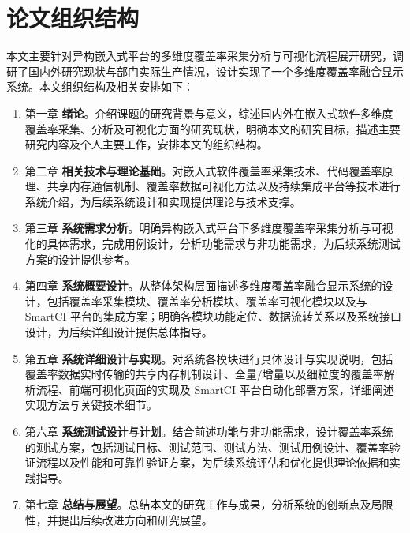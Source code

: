 \section{论文组织结构}
    本文主要针对异构嵌入式平台的多维度覆盖率采集分析与可视化流程展开研究，调研了国内外研究现状与部门实际生产情况，设计实现了一个多维度覆盖率融合显示系统。本文组织结构及相关安排如下：
    \begin{enumerate}
        \item 第一章 \textbf{绪论}。介绍课题的研究背景与意义，综述国内外在嵌入式软件多维度覆盖率采集、分析及可视化方面的研究现状，明确本文的研究目标，描述主要研究内容及个人主要工作，安排本文的组织结构。
        \item 第二章 \textbf{相关技术与理论基础}。对嵌入式软件覆盖率采集技术、代码覆盖率原理、共享内存通信机制、覆盖率数据可视化方法以及持续集成平台等技术进行系统介绍，为后续系统设计和实现提供理论与技术支撑。
        \item 第三章 \textbf{系统需求分析}。明确异构嵌入式平台下多维度覆盖率采集分析与可视化的具体需求，完成用例设计，分析功能需求与非功能需求，为后续系统测试方案的设计提供参考。
        \item 第四章 \textbf{系统概要设计}。从整体架构层面描述多维度覆盖率融合显示系统的设计，包括覆盖率采集模块、覆盖率分析模块、覆盖率可视化模块以及与 SmartCI 平台的集成方案；明确各模块功能定位、数据流转关系以及系统接口设计，为后续详细设计提供总体指导。
        \item 第五章 \textbf{系统详细设计与实现}。对系统各模块进行具体设计与实现说明，包括覆盖率数据实时传输的共享内存机制设计、全量/增量以及细粒度的覆盖率解析流程、前端可视化页面的实现及 SmartCI 平台自动化部署方案，详细阐述实现方法与关键技术细节。
        \item 第六章 \textbf{系统测试设计与计划}。结合前述功能与非功能需求，设计覆盖率系统的测试方案，包括测试目标、测试范围、测试方法、测试用例设计、覆盖率验证流程以及性能和可靠性验证方案，为后续系统评估和优化提供理论依据和实践指导。
        \item 第七章 \textbf{总结与展望}。总结本文的研究工作与成果，分析系统的创新点及局限性，并提出后续改进方向和研究展望。
    \end{enumerate}
